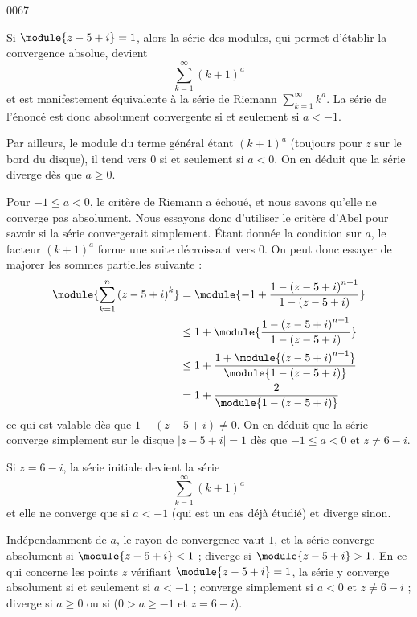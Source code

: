 \begin{corrige}{0067}
\begin{enumerate}
Si $\module{z - 5 + i} = 1$, alors la série des modules, qui permet
d'établir la convergence absolue, devient
\begin{equation*}
\sum_{k=1}^\infty (k+1)^a
\end{equation*}
et est manifestement équivalente à la série de Riemann $\sum_{k=1}^\infty k^a$. La série de l'énoncé est donc absolument convergente si et seulement si $a < -1$.

Par ailleurs, le module du terme général étant ${(k+1)}^a$ (toujours pour $z$ sur le bord du disque), il tend vers $0$ si et seulement si $a < 0$. On en déduit que la série diverge dès que $a\geq 0$.

Pour $-1 \leq a < 0$, le \og critère de Riemann\fg{} a échoué, et nous savons qu'elle ne converge pas absolument. Nous essayons donc d'utiliser le critère d'Abel pour savoir si la série convergerait simplement. Étant donnée la condition sur $a$, le facteur ${(k+1)}^a$ forme une suite décroissant vers $0$. On peut donc essayer de majorer les sommes partielles suivante :
\begin{equation*}
\begin{split}
\module{\sum_{k=1}^n {(z- 5 + i)}^k} &= \module{-1 + \frac{1 -
{(z- 5 + i)}^{n+1}}{1 - (z - 5 + i)}} \\
&\leq 1+ \module{\frac{1 -
{(z- 5 + i)}^{n+1}}{1 - (z - 5 + i)}} \\
&\leq 1 + \frac{1 + \module{{(z - 5 + i)}^{n+1}}}{\module{1 - (z
- 5 + i)}}\\
&= 1 + \frac2{\module{1 - (z - 5 + i)}}
\end{split}
\end{equation*}
ce qui est valable dès que $1 - (z - 5 + i) \neq 0$. On en déduit que la série converge simplement sur le disque $| z-5+i |=1$ dès que $-1\leq a < 0$ et $z \neq 6-i$.

Si $z = 6 - i$, la série initiale devient la série
\begin{equation*}
	\sum_{k=1}^\infty {(k+1)}^a
\end{equation*}
et elle ne converge que si $a < -1$ (qui est un cas déjà étudié) et
diverge sinon.

\conclusion 
	Indépendamment de $a$, le rayon de convergence vaut $1$, et la série converge absolument si $\module{z - 5 + i}<1$ ; diverge si $\module{z - 5 + i}>1$. En ce qui concerne les points $z$ vérifiant $\module{z - 5 + i}=1$, la série y converge absolument si et seulement si $a < -1$ ; converge simplement si $a < 0$ et $z \neq 6-i$ ; diverge si $a \geq 0$ ou si ($0 > a \geq -1$ et $z = 6-i$).


\end{enumerate}
\end{corrige}
